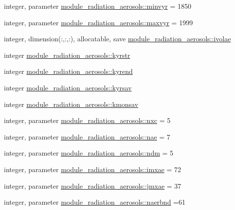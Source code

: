 \begin{DoxyCompactItemize}
\item 
integer, parameter \hyperlink{namespacemodule__radiation__aerosols_ab37644d8cc2c222af700b86db91f05e7}{module\+\_\+radiation\+\_\+aerosols\+::minvyr} = 1850
\item 
integer, parameter \hyperlink{namespacemodule__radiation__aerosols_ad856a3d564ff84043219626759673f27}{module\+\_\+radiation\+\_\+aerosols\+::maxvyr} = 1999
\item 
integer, dimension(\+:,\+:,\+:), allocatable, save \hyperlink{namespacemodule__radiation__aerosols_ab016f51c81a1157ee234dc82f8f114ee}{module\+\_\+radiation\+\_\+aerosols\+::ivolae}
\item 
integer \hyperlink{namespacemodule__radiation__aerosols_af224f7d7991e3d48aeaa4d221da50f41}{module\+\_\+radiation\+\_\+aerosols\+::kyrstr}
\item 
integer \hyperlink{namespacemodule__radiation__aerosols_a79127786cce93bccf8749ef8c85f6467}{module\+\_\+radiation\+\_\+aerosols\+::kyrend}
\item 
integer \hyperlink{namespacemodule__radiation__aerosols_a928c08857f866e4b848873a23a1d49e7}{module\+\_\+radiation\+\_\+aerosols\+::kyrsav}
\item 
integer \hyperlink{namespacemodule__radiation__aerosols_a302ae8a5aa2b8fb08ad366ef124cee45}{module\+\_\+radiation\+\_\+aerosols\+::kmonsav}
\item 
integer, parameter \hyperlink{namespacemodule__radiation__aerosols_a1fffbb55ad2986a216b721a6c103c4cf}{module\+\_\+radiation\+\_\+aerosols\+::nxc} = 5
\item 
integer, parameter \hyperlink{namespacemodule__radiation__aerosols_a45121ca4dcb3194e8afb4090fa810657}{module\+\_\+radiation\+\_\+aerosols\+::nae} = 7
\item 
integer, parameter \hyperlink{namespacemodule__radiation__aerosols_ae77b22f76f193cef19b6e6c3ee8e0773}{module\+\_\+radiation\+\_\+aerosols\+::ndm} = 5
\item 
integer, parameter \hyperlink{namespacemodule__radiation__aerosols_a52cda855a397136f75768d205292ddbb}{module\+\_\+radiation\+\_\+aerosols\+::imxae} = 72
\item 
integer, parameter \hyperlink{namespacemodule__radiation__aerosols_afdfdd058364062349b02cec9c712ea80}{module\+\_\+radiation\+\_\+aerosols\+::jmxae} = 37
\item 
integer, parameter \hyperlink{namespacemodule__radiation__aerosols_ae8ffb66e7e617f045663ce2732743b4a}{module\+\_\+radiation\+\_\+aerosols\+::naerbnd} =61
\item 

\end{DoxyCompactItemize}

